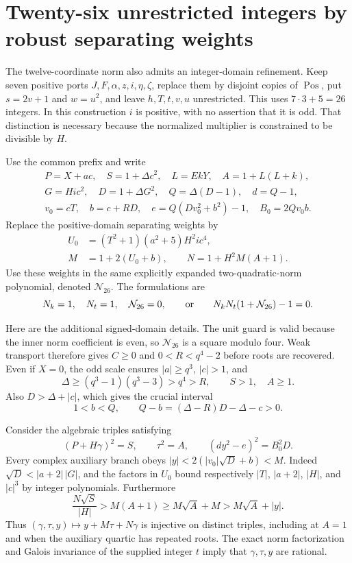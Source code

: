 \section{Twenty-six unrestricted integers by robust separating weights}
\label{sec:integer26}

The twelve-coordinate norm also admits an integer-domain refinement.
Keep seven positive ports
$J,F,\alpha,z,i,\eta,\zeta$, replace them by disjoint copies of
$\operatorname{Pos}$, put $s=2v+1$ and $w=u^2$, and leave $h,T,t,v,u$
unrestricted. This uses $7\cdot3+5=26$ integers. In this construction
$i$ is positive, with no assertion that it is odd. That distinction is
necessary because the normalized multiplier is constrained to be
divisible by $H$.

Use the common prefix and write
\[
 \begin{gathered}
 P=X+ac,\quad S=1+\Delta c^2,\quad
 L=EkY,\quad A=1+L(L+k),\\
 G=Hic^2,\quad D=1+\Delta G^2,\quad
 Q=\Delta(D-1),\quad d=Q-1,\\
 v_0=cT,\quad b=c+RD,\quad
 e=Q(Dv_0^2+b^2)-1,\quad B_0=2Qv_0b.
 \end{gathered}
\]
Replace the positive-domain separating weights by
\[
 \begin{split}
 U_0&=(T^2+1)(a^2+5)H^2ic^4,\\
 M&=1+2(U_0+b),\qquad N=1+H^2M(A+1).
 \end{split}
\]
Use these weights in the same explicitly expanded two-quadratic-norm
polynomial, denoted $\mathcal N_{26}$. The formulations are
\[
 N_k=1,\quad N_t=1,\quad\mathcal N_{26}=0,
 \qquad\hbox{or}\qquad
 N_kN_t(1+\mathcal N_{26})-1=0.
\]

Here are the additional signed-domain details. The unit guard is valid
because the inner norm coefficient is even, so $\mathcal N_{26}$ is a
square modulo four. Weak transport therefore gives $C\ge0$ and
$0<R<q^4-2$ before roots are recovered. Even if $X=0$, the odd scale
ensures $|a|\ge q^3$, $|c|>1$, and
\[
 \Delta\ge(q^3-1)(q^3-3)>q^4>R,
 \qquad S>1,\quad A\ge1.
\]
Also $D>\Delta+|c|$, which gives the crucial interval
\[
 1<b<Q,
 \qquad Q-b=(\Delta-R)D-\Delta-c>0.
\]

Consider the algebraic triples satisfying
\[
 (P+H\gamma)^2=S,\qquad \tau^2=A,\qquad
 (dy^2-e)^2=B_0^2D.
\]
Every complex auxiliary branch obeys
$|y|<2(|v_0|\sqrt D+b)<M$. Indeed
$\sqrt D<|a+2|\,|G|$, and the factors in $U_0$ bound respectively
$|T|$, $|a+2|$, $|H|$, and $|c|^3$ by integer polynomials.
Furthermore
\[
 \frac{N\sqrt S}{|H|}>M(A+1)
 \ge M\sqrt A+M>M\sqrt A+|y|.
\]
Thus $(\gamma,\tau,y)\mapsto y+M\tau+N\gamma$ is injective on
distinct triples, including at $A=1$ and when the auxiliary quartic
has repeated roots. The exact norm factorization and Galois invariance
of the supplied integer $t$ imply that $\gamma,\tau,y$ are rational.

